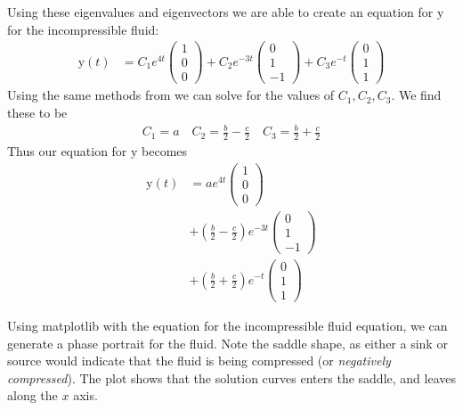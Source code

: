 \documentclass[10pt]{article}
\newenvironment{Figure}
{\par\medskip\noindent\minipage{\linewidth}}
{\endminipage\par\medskip}
\begin{document}
\begin{multicols}{2}
Using these eigenvalues and eigenvectors we are able to create an equation
for $\mathrm{y}$ for the incompressible fluid:
\begin{align*}
  \mathrm{y}\left(t\right) &= C_{1}e^{4t}\begin{pmatrix}1\\0\\0\end{pmatrix} +
  C_{2}e^{-3t}\begin{pmatrix}0\\1\\-1\end{pmatrix} +
  C_{3}e^{-t}\begin{pmatrix}0\\1\\1\end{pmatrix}
\end{align*}
Using the same methods from  we can solve for the
values of $C_1,C_2,C_3$. We find these to be
\begin{align*}
  C_1 = a \quad
  C_2 = \frac{b}{2}-\frac{c}{2} \quad
  C_3 = \frac{b}{2}+\frac{c}{2}
\end{align*}
Thus our equation for $\mathrm{y}$ becomes
\begin{align*}
  \mathrm{y}\left(t\right) &=
  ae^{4t}\begin{pmatrix}1\\0\\0\end{pmatrix}\\
  &+\left(\frac{b}{2}-\frac{c}{2}\right)e^{-3t}\begin{pmatrix}0\\1\\-1\end{pmatrix}\\
  &+\left(\frac{b}{2}+\frac{c}{2}\right)e^{-t}\begin{pmatrix}0\\1\\1\end{pmatrix}
\end{align*}

Using matplotlib with the equation for the incompressible fluid equation, we
can generate a phase portrait for the fluid. Note the saddle shape, as either
a sink or source would indicate that the fluid is being compressed (or
\textit{negatively compressed}). The plot shows that the solution curves enters
the saddle, and leaves along the $x$ axis.

\begin{Figure}
  \centering
  \def\svgwidth{\columnwidth}
  
  \label{fig:p1_1}
\end{Figure}


\end{multicols}
\end{document}
